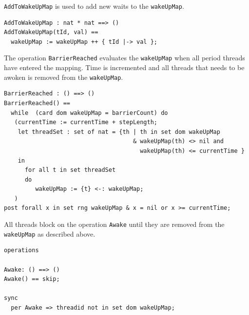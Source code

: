 \documentclass{overturerepchap}
\begin{document}
\texttt{AddToWakeUpMap} is used to add new waits to the \texttt{wakeUpMap}.

\begin{lstlisting}
AddToWakeUpMap : nat * nat ==> ()
AddToWakeUpMap(tId, val) ==
  wakeUpMap := wakeUpMap ++ { tId |-> val };
\end{lstlisting}

The operation \texttt{BarrierReached} evaluates the \texttt{wakeUpMap} when 
all period threads have entered the mapping. Time is incremented and all threads
that needs to be awoken is removed from the \texttt{wakeUpMap}.

\begin{lstlisting}
BarrierReached : () ==> ()
BarrierReached() == 
  while  (card dom wakeUpMap = barrierCount) do
   (currentTime := currentTime + stepLength;
    let threadSet : set of nat = {th | th in set dom wakeUpMap 
                                     & wakeUpMap(th) <> nil and 
                                       wakeUpMap(th) <= currentTime }
    in
      for all t in set threadSet 
      do
         wakeUpMap := {t} <-: wakeUpMap;
   )
post forall x in set rng wakeUpMap & x = nil or x >= currentTime;
\end{lstlisting}

All threads block on the operation \texttt{Awake} until they are removed from
the \texttt{wakeUpMap} as described above.

\begin{lstlisting}
operations

Awake: () ==> ()
Awake() == skip;

sync
  per Awake => threadid not in set dom wakeUpMap;
\end{lstlisting}

%

%

%
%
%
\end{document}
